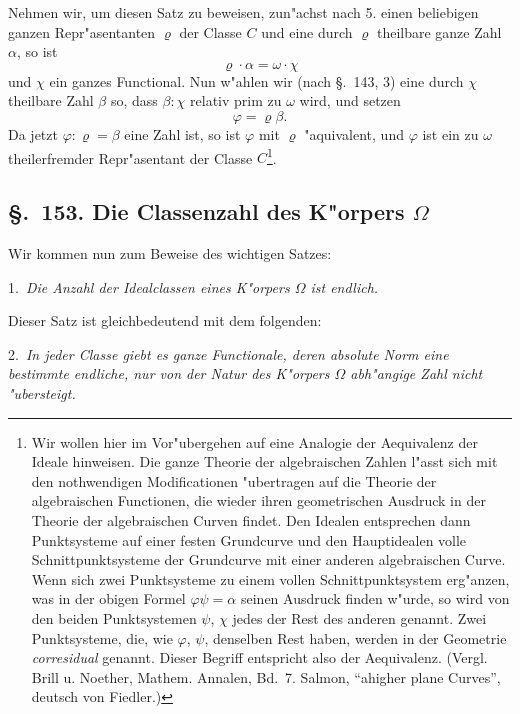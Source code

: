 \documentclass[12pt,a4paper]{article}
\theoremstyle{definition}
\begin{document}
Nehmen wir, um diesen Satz zu beweisen, zun"achst nach 5. einen beliebigen ganzen Repr"asentanten $\varrho$ der Classe $C$ und eine durch $\varrho$ theilbare ganze Zahl $\alpha$, so ist
\begin{equation}
\varrho\cdot\alpha = \omega\cdot\chi
\end{equation}
und $\chi$ ein ganzes Functional. Nun w"ahlen wir (nach \S.~143, 3) eine durch $\chi$ theilbare Zahl $\beta$ so, dass $\beta : \chi$ relativ prim zu $\omega$ wird, und setzen
\begin{equation}
\varphi = \varrho\beta.
\end{equation}
Da jetzt $\varphi : \varrho = \beta$ eine Zahl ist, so ist $\varphi$ mit $\varrho$ "aquivalent, und $\varphi$ ist ein zu $\omega$ theilerfremder Repr"asentant der Classe $C$\footnote{Wir wollen hier im Vor"ubergehen auf eine Analogie der Aequivalenz der Ideale hinweisen. Die ganze Theorie der algebraischen Zahlen l"asst sich mit den nothwendigen Modificationen "ubertragen auf die Theorie der algebraischen Functionen, die wieder ihren geometrischen Ausdruck in der Theorie der algebraischen Curven findet. Den Idealen entsprechen dann Punktsysteme auf einer festen Grundcurve und den Hauptidealen volle Schnittpunktsysteme der Grundcurve mit einer anderen algebraischen Curve. Wenn sich zwei Punktsysteme zu einem vollen Schnittpunktsystem erg"anzen, was in der obigen Formel $\varphi\psi = \alpha$ seinen Ausdruck finden w"urde, so wird von den beiden Punktsystemen $\psi$, $\chi$ jedes der Rest des anderen genannt. Zwei Punktsysteme, die, wie $\varphi$, $\psi$, denselben Rest haben, werden in der Geometrie \emph{corresidual} genannt. Dieser Begriff entspricht also der Aequivalenz. (Vergl. Brill u. Noether, Mathem. Annalen, Bd.~7. Salmon, ``ahigher plane Curves'', deutsch von Fiedler.)}.

\subsection*{\S.~153. Die Classenzahl des K"orpers $\Omega$}

Wir kommen nun zum Beweise des wichtigen Satzes:

1.~\emph{Die Anzahl der Idealclassen eines K"orpers $\Omega$ ist endlich.}

Dieser Satz ist gleichbedeutend mit dem folgenden:

2.~\emph{In jeder Classe giebt es ganze Functionale, deren absolute Norm eine bestimmte endliche, nur von der Natur des K"orpers $\Omega$ abh"angige Zahl nicht "ubersteigt.}
\end{document}

